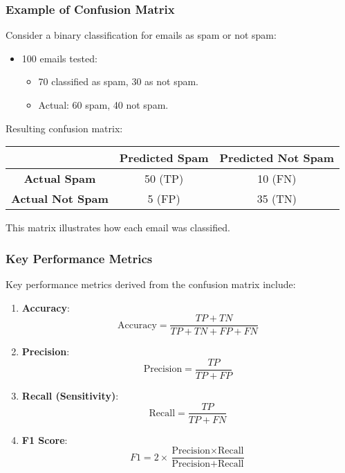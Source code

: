 \documentclass{beamer}
\begin{document}
\begin{frame}[fragile]
    \frametitle{Example of Confusion Matrix}
    Consider a binary classification for emails as spam or not spam:

    \begin{itemize}
        \item 100 emails tested:
        \begin{itemize}
            \item 70 classified as spam, 30 as not spam.
            \item Actual: 60 spam, 40 not spam.
        \end{itemize}
    \end{itemize}
    
    Resulting confusion matrix:

    \begin{table}[ht]
        \centering
        \begin{tabular}{|c|c|c|}
            \hline
            & \textbf{Predicted Spam} & \textbf{Predicted Not Spam} \\
            \hline
            \textbf{Actual Spam} & 50 (TP) & 10 (FN) \\
            \hline
            \textbf{Actual Not Spam} & 5 (FP) & 35 (TN) \\
            \hline
        \end{tabular}
    \end{table}
    
    This matrix illustrates how each email was classified.
\end{frame}

\begin{frame}[fragile]
    \frametitle{Key Performance Metrics}
    Key performance metrics derived from the confusion matrix include:

    \begin{enumerate}
        \item \textbf{Accuracy}:
        \begin{equation}
        \text{Accuracy} = \frac{TP + TN}{TP + TN + FP + FN}
        \end{equation}
        
        \item \textbf{Precision}:
        \begin{equation}
        \text{Precision} = \frac{TP}{TP + FP}
        \end{equation}
        
        \item \textbf{Recall (Sensitivity)}:
        \begin{equation}
        \text{Recall} = \frac{TP}{TP + FN}
        \end{equation}
        
        \item \textbf{F1 Score}:
        \begin{equation}
        F1 = 2 \times \frac{\text{Precision} \times \text{Recall}}{\text{Precision} + \text{Recall}}
        \end{equation}
    \end{enumerate}
\end{frame}
\end{document}
